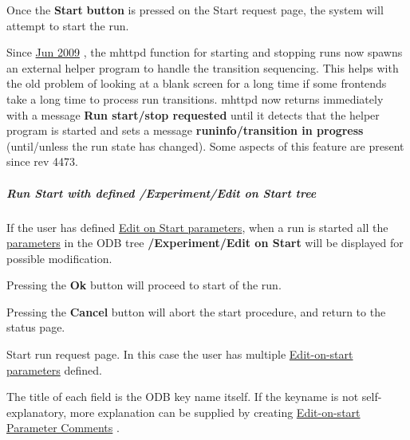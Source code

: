 Once the {\bfseries Start} {\bfseries button} is pressed on the Start request page, the system will attempt to start the run.

 Since \hyperlink{NDF_ndf_jun_2009}{Jun 2009} , the mhttpd function for starting and stopping runs now spawns an external helper program to handle the transition sequencing. This helps with the old problem of looking at a blank screen for a long time if some frontends take a long time to process run transitions. mhttpd now returns immediately with a message {\bfseries Run start/stop requested} until it detects that the helper program is started and sets a message {\bfseries runinfo/transition in progress} (until/unless the run state has changed). Some aspects of this feature are present since rev 4473. 

\par


\par
\hypertarget{RC_mhttpd_Start_page_RC_mhttpd_Edit_On_Start}{}\subparagraph{Run Start with defined /Experiment/Edit on Start tree}\label{RC_mhttpd_Start_page_RC_mhttpd_Edit_On_Start}
If the user has defined \hyperlink{RC_customize_ODB_RC_Edit_On_Start}{Edit on Start parameters}, when a run is started all the \hyperlink{structparameters}{parameters} in the ODB tree {\bfseries  /Experiment/Edit on Start } will be displayed  for possible modification.
\begin{DoxyItemize}
\item Pressing the {\bfseries Ok} button will proceed to start of the run.
\item Pressing the {\bfseries Cancel} button will abort the start procedure, and return to the status page.
\end{DoxyItemize}

\par
\par
\par
 \begin{center} Start run request page. In this case the user has multiple \hyperlink{RC_customize_ODB_RC_Edit_On_Start}{Edit-\/on-\/start parameters} defined. \par
\par
\par
  \end{center}  \par
\par
\par


The title of each field is the ODB key name itself. If the keyname is not self-\/explanatory, more explanation can be supplied by creating \hyperlink{RC_mhttpd_Start_page_RC_Edit_PC}{Edit-\/on-\/start Parameter Comments} .

